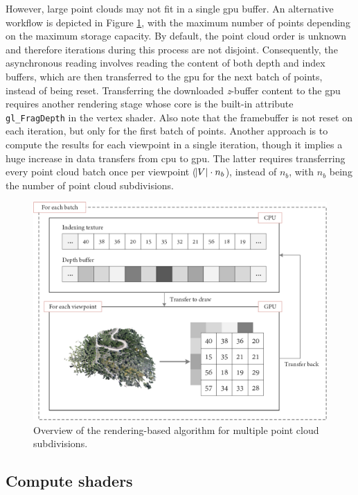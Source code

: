 However, large point clouds may not fit in a single \acrshort{gpu} buffer. An alternative workflow is depicted in Figure \ref{fig:occlusion_opengl_zbuffer_multiple_batches}, with the maximum number of points depending on the maximum storage capacity. By default, the point cloud order is unknown and therefore iterations during this process are not disjoint. Consequently, the asynchronous reading involves reading the content of both depth and index buffers, which are then transferred to the \acrshort{gpu} for the next batch of points, instead of being reset. Transferring the downloaded \textit{z}-buffer content to the \acrshort{gpu} requires another rendering stage whose core is the built-in attribute \verb|gl_FragDepth| in the vertex shader. Also note that the framebuffer is not reset on each iteration, but only for the first batch of points. Another approach is to compute the results for each viewpoint in a single iteration, though it implies a huge increase in data transfers from \acrshort{cpu} to \acrshort{gpu}. The latter requires transferring every point cloud batch once per viewpoint ($\abs{V} \cdot n_{b}$), instead of $n_{b}$, with $n_{b}$ being the number of point cloud subdivisions.

\begin{figure}[htb]
    \centering
    \includegraphics[width=\linewidth]{figs/multi_thermal_projection/multiple_batches_opengl_gpu.png}
    \caption{Overview of the rendering-based algorithm for multiple point cloud subdivisions.}
    \label{fig:occlusion_opengl_zbuffer_multiple_batches}
\end{figure}

\subsection{Compute shaders}


